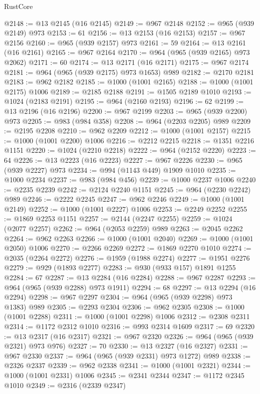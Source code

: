 \begin{lexlean}{RustCore}
\begin{coremodule}
@2148 := @13 @2145 (@16 @2145)
@2149 := @967 @2148
@2152 := @965 (@939 @2149) @973
@2153 := 61
@2156 := @13 @2153 (@16 @2153)
@2157 := @967 @2156
@2160 := @965 (@939 @2157) @973
@2161 := 59
@2164 := @13 @2161 (@16 @2161)
@2165 := @967 @2164
@2170 := @964 (@965 (@939 @2165) @973 @2062)
@2171 := 60
@2174 := @13 @2171 (@16 @2171)
@2175 := @967 @2174
@2181 := @964 (@965 (@939 @2175) @973 @1653) @989
@2182 := @2170 @2181
@2183 := @962 @2182
@2185 := @1000 (@1001 @2165)
@2188 := @1000 (@1001 @2175) @1006
@2189 := @2185 @2188
@2191 := @1505 @2189 @1010
@2193 := @1024 (@2183 @2191)
@2195 := @964 (@2160 @2193)
@2196 := 62
@2199 := @13 @2196 (@16 @2196)
@2200 := @967 @2199
@2203 := @965 (@939 @2200) @973
@2205 := @983 (@984 @358)
@2208 := @964 (@2203 @2205) @989
@2209 := @2195 @2208
@2210 := @962 @2209
@2212 := @1000 (@1001 @2157)
@2215 := @1000 (@1001 @2200) @1006
@2216 := @2212 @2215
@2218 := @1351 @2216 @1151
@2220 := @1024 (@2210 @2218)
@2222 := @964 (@2152 @2220)
@2223 := 64
@2226 := @13 @2223 (@16 @2223)
@2227 := @967 @2226
@2230 := @965 (@939 @2227) @973
@2234 := @994 (@1143 @449) @1909 @1010
@2235 := @1000 @2234
@2237 := @983 (@984 @456)
@2239 := @1000 @2237 @1006
@2240 := @2235 @2239
@2242 := @2124 @2240 @1151
@2245 := @964 (@2230 @2242) @989
@2246 := @2222 @2245
@2247 := @962 @2246
@2249 := @1000 (@1001 @2149)
@2252 := @1000 (@1001 @2227) @1006
@2253 := @2249 @2252
@2255 := @1869 @2253 @1151
@2257 := @2144 (@2247 @2255)
@2259 := @1024 (@2077 @2257)
@2262 := @964 (@2053 @2259) @989
@2263 := @2045 @2262
@2264 := @962 @2263
@2266 := @1000 (@1001 @2040)
@2269 := @1000 (@1001 @2050) @1006
@2270 := @2266 @2269
@2272 := @1869 @2270 @1010
@2274 := @2035 (@2264 @2272)
@2276 := @1959 (@1988 @2274)
@2277 := @1951 @2276
@2279 := @929 (@1893 @2277)
@2283 := @930 (@933 @157) @1891 @1255
@2284 := 67
@2287 := @13 @2284 (@16 @2284)
@2288 := @967 @2287
@2293 := @964 (@965 (@939 @2288) @973 @1911)
@2294 := 68
@2297 := @13 @2294 (@16 @2294)
@2298 := @967 @2297
@2304 := @964 (@965 (@939 @2298) @973 @1383) @989
@2305 := @2293 @2304
@2306 := @962 @2305
@2308 := @1000 (@1001 @2288)
@2311 := @1000 (@1001 @2298) @1006
@2312 := @2308 @2311
@2314 := @1172 @2312 @1010
@2316 := @993 @2314 @1609
@2317 := 69
@2320 := @13 @2317 (@16 @2317)
@2321 := @967 @2320
@2326 := @964 (@965 (@939 @2321) @973 @976)
@2327 := 70
@2330 := @13 @2327 (@16 @2327)
@2331 := @967 @2330
@2337 := @964 (@965 (@939 @2331) @973 @1272) @989
@2338 := @2326 @2337
@2339 := @962 @2338
@2341 := @1000 (@1001 @2321)
@2344 := @1000 (@1001 @2331) @1006
@2345 := @2341 @2344
@2347 := @1172 @2345 @1010
@2349 := @2316 (@2339 @2347)

\end{coremodule}
\end{lexlean}
